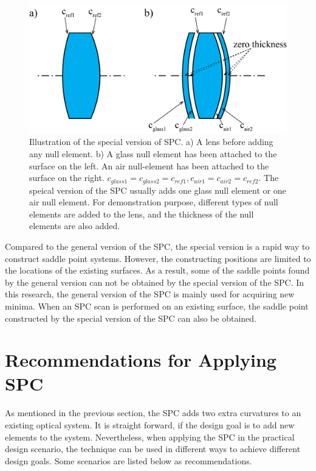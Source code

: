 \begin{figure}[h!]
    \centering
    \includegraphics[scale=0.45]{chapter-2/figures/SPCS_illus.png}
    \caption{Illustration of the special version of SPC. a) A lens before adding any null element. b)  A glass null element has been attached to the surface on the left. An air null-element has been attached to the surface on the right. $c_{glass1} = c_{glass2} = c_{ref1}, c_{air1} = c_{air2} = c_{ref2}$. The speical version of the SPC usually adds one glass null element or one air null element. For demonstration purpose, different types of null elements are added to the lens, and the thickness of the null elements are also added.}
    \label{fig:SPCS-illus}
\end{figure}

Compared to the general version of the SPC, the special version is a rapid way to construct saddle point systems. However, the constructing positions are limited to the locations of the existing surfaces. As a result, some of the saddle points found by the general version can not be obtained by the special version of the SPC. In this research, the general version of the SPC is mainly used for acquiring new minima. When an SPC scan is performed on an existing surface, the saddle point constructed by the special version of the SPC can also be obtained. 


\section{Recommendations for Applying SPC}\label{section: SPC recommendation}
As mentioned in the previous section, the SPC adds two extra curvatures to an existing optical system. It is straight forward, if the design goal is to add new elements to the system. Nevertheless, when applying the SPC in the practical design scenario, the technique can be used in different ways to achieve different design goals. Some scenarios are listed below as recommendations.

